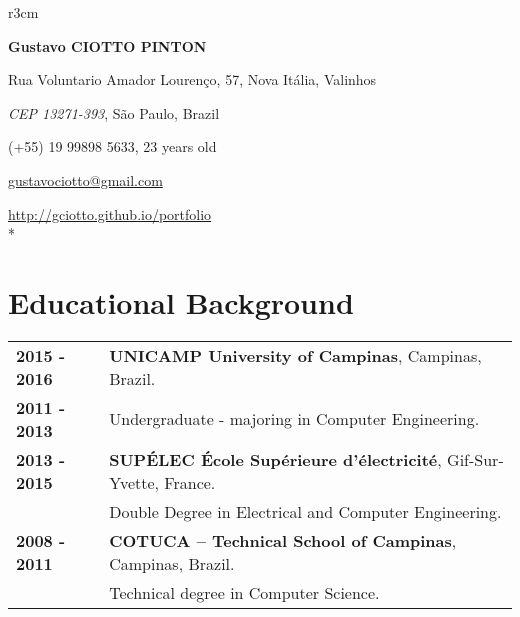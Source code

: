 \documentclass[10pt, a4paper]{article}
\author{Gustavo Ciotto Pinton}
\begin{document}
\pagestyle{empty} 

\begin{wrapfigure}{r}{3cm}
  \vspace{-20pt}
  \begin{center}
  \end{center}
\end{wrapfigure}

\textbf{\LARGE Gustavo CIOTTO PINTON}

Rua Voluntario Amador Lourenço, 57, Nova Itália, Valinhos

\textit{CEP 13271-393}, São Paulo, Brazil

(+55) 19 99898 5633, 23 years old

\url{gustavociotto@gmail.com} 

\url{http://gciotto.github.io/portfolio}\\*



\section{Educational Background}

\begin{tabular}{p{} p{}}

 \textbf{2015 - 2016} & \textbf{UNICAMP University of
 Campinas}, Campinas, Brazil.
 \\
 \textbf{2011 - 2013} & Undergraduate -  majoring in
 Computer Engineering. \vspace{4pt}
 \\ 

 \textbf{2013 - 2015} & \textbf{SUPÉLEC  École Supérieure d'électricité},
 Gif-Sur-Yvette, France. \\
 & Double Degree in Electrical and Computer Engineering. \vspace{4pt}\\

 
 \textbf{2008 - 2011} & \textbf{COTUCA – Technical School of Campinas},
 Campinas, Brazil. \\
 & Technical degree in Computer Science. \\
\end{tabular}
\end{document}

